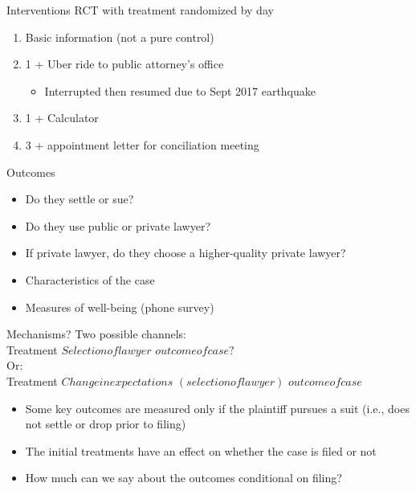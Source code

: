 \documentclass[8pt]{beamer}
\begin{document}
\begin{frame}{Interventions}
RCT with treatment randomized by day
\begin{enumerate}
    \item Basic information (not a pure control)
    \item 1 + Uber ride to public attorney's office
    \begin{itemize}
        \item Interrupted then resumed due to Sept 2017 earthquake
    \end{itemize}
    \item 1 + Calculator 
    \item 3 + appointment letter for conciliation meeting
\end{enumerate}
Outcomes \begin{itemize}
    \item Do they settle or sue?
    \item Do they use public or private lawyer?
    \item If private lawyer, do they choose a higher-quality private lawyer?
    \item Characteristics of the case
    \item Measures of well-being (phone survey)
\end{itemize}
\end{frame}
 
 \begin{frame}{Mechanisms?}
Two possible channels: \\
\vspace{.1in}
 Treatment \xrightarrow{} $Selection of lawyer$ \xrightarrow{} $outcome of case?$  \\
 
 \vspace{.1in}
 Or:
 \\
 \vspace{.1in}
    Treatment \xrightarrow{} $Change in expectations$ \xrightarrow{} $(selection of lawyer)$ \xrightarrow{} $outcome of case$

  
    \vspace{.2in}
\begin{itemize}
\item Some key outcomes are measured only if the plaintiff pursues a suit (i.e., does not settle or drop prior to filing)
\item The initial treatments have an effect on whether the case is filed or not
\item How much can we say about the outcomes conditional on filing? 
\end{itemize}

\end{frame}
\end{document}

